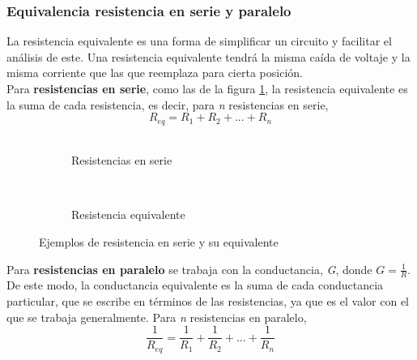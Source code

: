 \subsubsection{Equivalencia resistencia en serie y paralelo}


La resistencia equivalente es una forma de simplificar un circuito y facilitar el análisis de este. Una resistencia equivalente tendrá la misma caída de voltaje y la misma corriente que las que reemplaza para cierta posición.
\\

Para \textbf{resistencias en serie}, como las de la figura \ref{fig:rSerie}, la resistencia equivalente es la suma de cada resistencia, es decir, para \textit{n} resistencias en serie,
\begin{equation*}
R_{eq} = R_1 + R_2 + ... + R_n
\end{equation*}\\

\begin{figure}[h]
    \centering
    \begin{subfigure}{0.35\textwidth}

        \caption{Resistencias en serie}

    \end{subfigure}\hspace{1em}
    \begin{subfigure}{0.35\textwidth}

        \
        \caption{Resistencia equivalente}
    \end{subfigure}


    \caption{Ejemplos de resistencia en serie y su equivalente}

    \label{fig:rSerie}
\end{figure}

\indent Para \textbf{resistencias en paralelo} se trabaja con la conductancia, \textit{G}, donde $G = \frac{1}{R}$. De este modo, la conductancia equivalente es la suma de cada conductancia particular, que se escribe en términos de las resistencias, ya que es el valor con el que se trabaja generalmente. Para \textit{n} resistencias en paralelo,
\begin{equation*}\label{eq:resispar2}
\frac{1}{R_{eq}} = \frac{1}{R_1} + \frac{1}{R_2} + ... + \frac{1}{R_n}
\end{equation*}
\\

